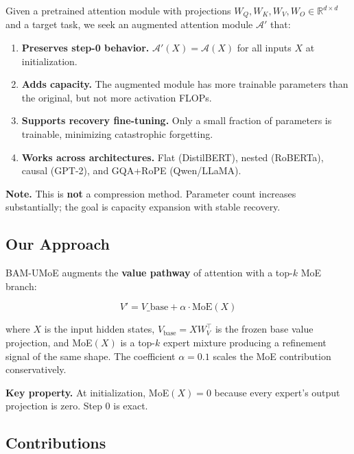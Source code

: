 Given a pretrained attention module with projections 
$W_Q, W_K, W_V, W_O \in \mathbb{R}^{d \times d}$ and a target task, we seek 
an augmented attention module $\mathcal{A}'$ that:

\begin{enumerate}
\item \textbf{Preserves step-0 behavior.} $\mathcal{A}'(X) = \mathcal{A}(X)$ for
  all inputs $X$ at initialization.
\item \textbf{Adds capacity.} The augmented module has more trainable parameters
  than the original, but not more activation FLOPs.
\item \textbf{Supports recovery fine-tuning.} Only a small fraction of parameters
  is trainable, minimizing catastrophic forgetting.
\item \textbf{Works across architectures.} Flat (DistilBERT), nested (RoBERTa),
  causal (GPT-2), and GQA+RoPE (Qwen/LLaMA).

\end{enumerate}
\textbf{Note.} This is \textbf{not} a compression method. Parameter count increases 
substantially; the goal is capacity expansion with stable recovery.

\subsection{Our Approach}

BAM-UMoE augments the \textbf{value pathway} of attention with a top-$k$ MoE 
branch:

\[
V' = V\_{\text{base}} + \alpha \cdot \text{MoE}(X)
\]

where $X$ is the input hidden states, $V_\text{base} = X W_V^\top$ is the 
frozen base value projection, and MoE$(X)$ is a top-$k$ expert mixture 
producing a refinement signal of the same shape. The coefficient $\alpha = 0.1$ 
scales the MoE contribution conservatively.

\textbf{Key property.} At initialization, MoE$(X) = 0$ because every expert's 
output projection is zero. Step 0 is exact.

\subsection{Contributions}

